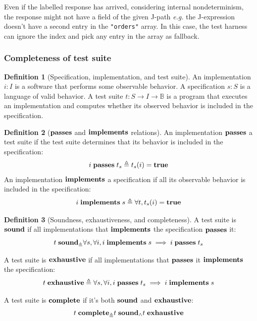 \documentclass{article}
\newcommand{\ilj}[1]{\lstinline[style=json]{#1}}
\theoremstyle{definition}
\newtheorem{definition}{Definition}
\newcommand{\sound}{\ottkw{sound}}
\newcommand{\issound}[2]{#1\;\sound_{#2}}
\newcommand{\complete}{\ottkw{complete}}
\newcommand{\iscomplete}[2]{#1\;\complete_{#2}}
\newcommand{\bool}{\mathbb B}
\newcommand{\true}{\ottkw{true}}
\newcommand{\imp}{\ottkw{implements}}
\newcommand{\pass}{\ottkw{passes}}
\newcommand{\exhaust}{\ottkw{exhaustive}}
\newcommand{\defeq}{\triangleq}
\newcommand{\implements}[2]{#1\;\imp\;#2}
\newcommand{\passes}[2]{#1\;\pass\;#2}
\newcommand{\isexhaust}[1]{#1\;\exhaust}
\begin{document}
Even if the labelled response has arrived, considering internal nondeterminism,
the response might not have a field of the given J-path {\it e.g.}  the
J-expression doesn't have a second entry in the \ilj{"orders"} array.  In this
case, the test harness can ignore the index and pick any entry in the array as
fallback.

\subsubsection{Completeness of test suite}

\begin{definition}[Specification, implementation, and test suite]
  An implementation $i:I$ is a software that performs some observable behavior.
  A specification $s:S$ is a language of valid behavior.  A test suite $t:S\to
  I\to\bool$ is a program that executes an implementation and computes whether
  its observed behavior is included in the specification.
\end{definition}

\begin{definition}[$\pass$ and $\imp$ relations]
  An implementation $\pass$ a test suite if the test suite determines that its
  behavior is included in the specification:
  \[ \passes{i}{t_s}\defeq t_s(i)=\true \]
  An implementation $\imp$ a specification if all its observable behavior is
  included in the specification:
  \[ \implements{i}{s}\defeq\forall t,t_s(i)=\true \]
\end{definition}

\begin{definition}[Soundness, exhaustiveness, and completeness]
  A test suite is $\sound$ if all implementations that $\imp$ the specification
  $\pass$ it:
  \[ \issound{t}\defeq\forall s,\forall i,
  \implements{i}{s}\implies\passes{i}{t_s} \]

  A test suite is $\exhaust$ if all implementations that $\pass$ it $\imp$ the
  specification:
  \[ \isexhaust{t}\defeq\forall s,\forall i,
  \passes{i}{t_s}\implies\implements{i}{s} \]

  A test suite is $\complete$ if it's both $\sound$ and $\exhaust$:
  \[ \iscomplete{t}\defeq\issound{t}\wedge\isexhaust{t} \]
\end{definition}
\end{document}
